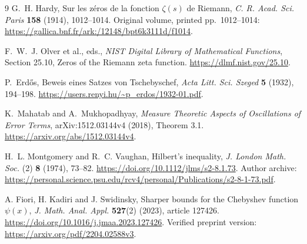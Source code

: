 \documentclass[11pt,a4paper]{article}
\theoremstyle{definition}
\theoremstyle{remark}
\begin{document}
\clearpage
\begin{thebibliography}{9}
G.~H. Hardy,
Sur les z\'eros de la fonction \(\zeta(s)\) de Riemann,
\emph{C. R. Acad. Sci. Paris} \textbf{158} (1914), 1012--1014.
Original volume, printed pp.~1012--1014:
\url{https://gallica.bnf.fr/ark:/12148/bpt6k3111d/f1014}.

F.~W.~J. Olver et al., eds.,
\emph{NIST Digital Library of Mathematical Functions},
Section 25.10, Zeros of the Riemann zeta function.
\url{https://dlmf.nist.gov/25.10}.

P.~Erd\H{o}s,
Beweis eines Satzes von Tschebyschef,
\emph{Acta Litt. Sci. Szeged} \textbf{5} (1932), 194--198.
\url{https://users.renyi.hu/~p_erdos/1932-01.pdf}.

K.~Mahatab and A.~Mukhopadhyay,
\emph{Measure Theoretic Aspects of Oscillations of Error Terms},
arXiv:1512.03144v4 (2018), Theorem 3.1.
\url{https://arxiv.org/abs/1512.03144v4}.

H.~L. Montgomery and R.~C. Vaughan,
Hilbert's inequality,
\emph{J. London Math. Soc.} (2) \textbf{8} (1974), 73--82.
\url{https://doi.org/10.1112/jlms/s2-8.1.73}.
Author archive:
\url{https://personal.science.psu.edu/rcv4/personal/Publications/s2-8-1-73.pdf}.

A. Fiori, H. Kadiri and J. Swidinsky,
Sharper bounds for the Chebyshev function \(\psi(x)\),
\emph{J. Math. Anal. Appl.} \textbf{527}(2) (2023), article 127426.
\url{https://doi.org/10.1016/j.jmaa.2023.127426}.
Verified preprint version:
\url{https://arxiv.org/pdf/2204.02588v3}.
\end{thebibliography}
\end{document}
